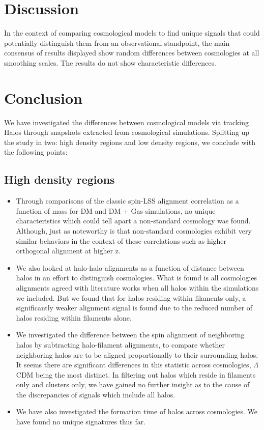 \documentclass[a4paper,fleqn,usenatbib]{mnras}
\def \lcdm{$\Lambda$CDM }
\begin{document}
\section{Discussion}\label{discussion}
In the context of comparing cosmological models to find unique signals that could potentially distinguish them from an observational standpoint, the main consensus of results displayed show random differences between cosmologies at all smoothing scales. The results do not show characteristic differences. 


\section{Conclusion}\label{conclusions}
We have investigated the differences between cosmological models via tracking Halos through snapshots extracted from cosmological simulations. Splitting up the study in two: high density regions and low density regions, we conclude with the following points:
\subsection{High density regions}
\begin{itemize}
    \item Through comparisons of the classic spin-LSS alignment correlation as a function of mass for DM and DM + Gas simulations, no unique characteristics which could tell apart a non-standard cosmology was found. Although, just as noteworthy is that non-standard cosmologies exhibit very similar behaviors in the context of these correlations such as higher orthogonal alignment at higher z.
    \item We also looked at halo-halo alignments as a function of distance between halos in an effort to distinguish cosmologies. What is found is all cosmologies alignments agreed with literature works when all halos within the simulations we included. But we found that for halos residing within filaments only, a significantly weaker alignment signal is found due to the reduced number of halos residing within filaments alone. 
    \item We investigated the difference between the spin alignment of neighboring halos by subtracting halo-filament alignments, to compare whether neighboring halos are to be aligned proportionally to their surrounding halos. It seems there are significant differences in this statistic across cosmologies, \lcdm being the most distinct. In filtering out halos which reside in filaments only and clusters only, we have gained no further insight as to the cause of the discrepancies of signals which include all halos. 
    \item We have also investigated the formation time of halos across cosmologies. We have found no unique signatures thus far. 

\end{itemize}
\end{document}
